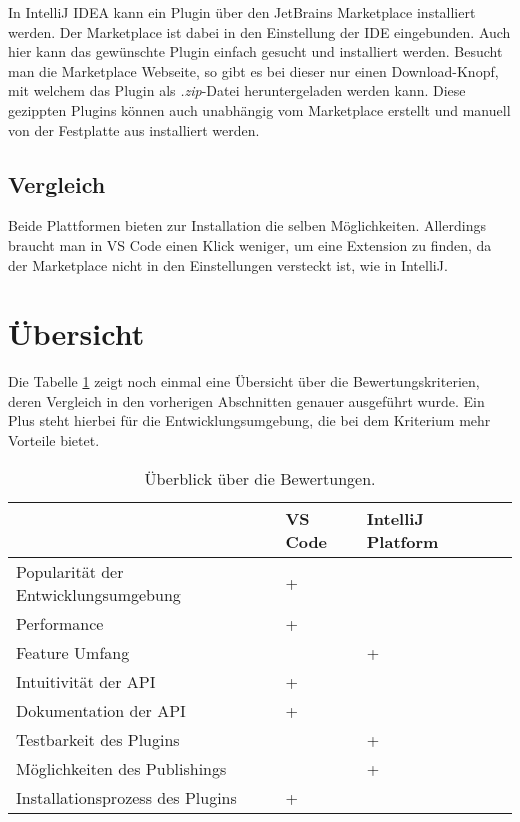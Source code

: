 In IntelliJ IDEA kann ein Plugin über den JetBrains Marketplace
installiert werden. Der Marketplace ist dabei in den Einstellung
der IDE eingebunden. Auch hier kann das gewünschte Plugin einfach
gesucht und installiert werden.
Besucht man die Marketplace Webseite, so gibt es bei dieser nur einen
Download-Knopf, mit welchem das Plugin als \emph{.zip}-Datei heruntergeladen
werden kann. Diese gezippten Plugins können auch
unabhängig vom Marketplace erstellt und manuell
von der Festplatte aus installiert werden.

\subsection{Vergleich}

Beide Plattformen bieten zur Installation die selben Möglichkeiten.
Allerdings braucht man in VS Code einen Klick weniger, um eine
Extension zu finden, da der Marketplace nicht in den Einstellungen
versteckt ist, wie in IntelliJ.


\section{Übersicht}

Die Tabelle \ref{tab:Ueberblick_Kriterien} zeigt noch
einmal eine Übersicht über die Bewertungskriterien,
deren Vergleich in den vorherigen Abschnitten genauer
ausgeführt wurde. Ein Plus steht hierbei für die Entwicklungsumgebung,
die bei dem Kriterium mehr Vorteile bietet.

\begin{table}[hb]
    \caption{Überblick über die Bewertungen.}
    \label{tab:Ueberblick_Kriterien}
    \centering
    \small %
    \setlength{\tabcolsep}{10pt} %
    \renewcommand{\arraystretch}{1.25} %

    \begin{tabular}{@{}llll@{}}
        \toprule
         & VS Code & IntelliJ Platform \\
        \midrule
        Popularität der Entwicklungsumgebung & + &  \\
        Performance & + &  \\
        Feature Umfang &  & + \\
        Intuitivität der API & + &  \\
        Dokumentation der API & + &  \\
        Testbarkeit des Plugins &  & + \\
        Möglichkeiten des Publishings &  & + \\
        Installationsprozess des Plugins & + &  \\
        \bottomrule
    \end{tabular}
    
\end{table}